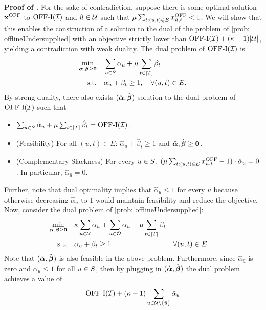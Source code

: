 {\noindent \textbf{Proof of .}
For the sake of contradiction, suppose there is some optimal solution $\mathbf{x}^{\mathrm{OFF}}$ to $\mathrm{\mathrm{OFF}}\textrm{-}\mathrm{I}(\mathcal I)$ and $\hat{u} \in \mathcal U$ such that $\mu \sum_{t: (u,t) \in E} x^{\mathrm{OFF}}_{\hat{u},t} < 1$. We will show that this enables the construction of a  solution to the dual of the problem of \ref{prob: offlineUndersupplied} with an objective strictly lower than $\mathrm{\mathrm{OFF}}\textrm{-}\mathrm{I}(\mathcal I) + (\kappa-1) |\mathcal U|$, yielding a contradiction with weak duality. The dual problem of $\mathrm{\mathrm{OFF}}\textrm{-}\mathrm{I}(\mathcal I)$ is 
    \begin{align*}
             \min_{\bm{\alpha}, \bm{\beta} \geq \mathbf{0}} \quad &  \sum_{u \in S} \alpha_u + \mu \sum_{t \in [T]} \beta_t\\
    \textrm{s.t.} \quad & \alpha_u + \beta_t \geq 1, \quad \forall (u,t) \in E.
\end{align*}
    By strong duality, there also exists $(\hat{\bm{\alpha}}, \hat{\bm{\beta}})$ solution to the dual problem of $\mathrm{\mathrm{OFF}}\textrm{-}\mathrm{I}(\mathcal I)$ such that
        \begin{itemize}
            \item $\sum_{u \in S} \hat{\alpha}_u + \mu \sum_{t \in [T]} \hat{\beta}_t = \mathrm{\mathrm{OFF}}\textrm{-}\mathrm{I}(\mathcal I)$.
            \item (Feasibility) For all $(u,t) \in E$: $\hat{\alpha}_u + \hat{\beta}_t \geq 1$ and $\hat{\bm{\alpha}}, \hat{\bm{\beta}} \geq \mathbf{0}$.
            \item (Complementary Slackness) For every $u \in S$, $(\mu \sum_{t: (u,t) \in E} x^{\mathrm{OFF}}_{u,t} -1) \cdot \hat{\alpha}_{u} = 0$. In particular, $\hat{\alpha}_{\hat{u}} = 0$.
        \end{itemize}
        Further, note that dual optimality implies that $\hat{\alpha}_u \leq 1$ for every $u$ because otherwise decreasing $\hat{\alpha}_u$ to $1$ would maintain feasibility and reduce the objective. Now, consider the  dual problem of \ref{prob: offlineUndersupplied}:
        \begin{align*}
             \min_{\bm{\alpha}, \bm{\beta} \geq \mathbf{0}} \quad & \kappa \sum_{u \in \mathcal U} \alpha_u + \sum_{u \in \mathcal O} \alpha_u + \mu \sum_{t \in [T]} \beta_t\\
    \textrm{s.t.} \quad & \alpha_u + \beta_t \geq 1. \quad && \forall (u,t) \in E.
\end{align*}
Note that $(\hat{\bm{\alpha}}, \hat{\bm{\beta}})$ is also feasible in the above problem. Furthermore, 
        since $\hat{\alpha}_{\hat{u}}$ is zero and $\alpha_u \leq 1$ for all $u \in S$, then by plugging in $(\hat{\bm{\alpha}}, \hat{\bm{\beta}})$ the dual problem achieves a value of $$\mathrm{\mathrm{OFF}}\textrm{-}\mathrm{I}(\mathcal I) + (\kappa - 1) \sum_{u \in \mathcal U \setminus \{ \hat{u} \}} \hat{\alpha}_u
$$}
